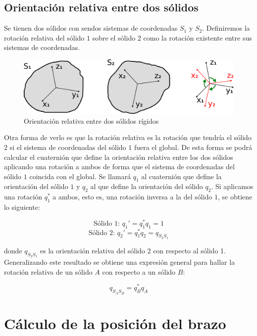 \documentclass[10pt, a4paper]{report}
\begin{document}
\subsection{Orientación relativa entre dos sólidos}

Se tienen dos sólidos con sendos sistemas de coordenadas $S_1$ y $S_2$. Definiremos la rotación relativa del sólido $1$ sobre el sólido $2$ como la rotación existente entre sus sistemas de coordenadas.\\

\begin{center}
\begin{figure}[h]
\includegraphics[scale=1]{../img/relative_orientation.png} 
\caption{Orientación relativa entre dos sólidos rígidos}
\end{figure}
\end{center}

Otra forma de verlo es que la rotación relativa es la rotación que tendría el sólido $2$ si el sistema de coordenadas del sólido $1$ fuera el global. De esta forma se podrá calcular el cuaternión que define la orientación relativa entre los dos sólidos aplicando una rotación a ambos de forma que el sistema de coordenadas del sólido $1$ coincida con el global. Se llamará $q_1$ al cuaternión que define la orientación del sólido $1$ y $q_2$ al que define la orientación del sólido $q_2$. Si aplicamos una rotación $q_1^*$ a ambos, esto es, una rotación inversa a la del sólido $1$, se obtiene lo siguiente:

$$ \text{Sólido 1: } q_1' = q_1^*q_1 = 1 $$
$$ \text{Sólido 2: } q_2' = q_1^*q_2 = q_{S_2S_1} $$

donde $q_{S_2S_1}$ es la orientación relativa del sólido 2 con respecto al sólido 1. Generalizando este resultado se obtiene una expresión general para hallar la rotación relativa de un sólido $A$ con respecto a un sólido $B$:

\begin{equation}
q_{S_AS_B} = q_B^*q_A
\end{equation}

\section{Cálculo de la posición del brazo}
\end{document}
